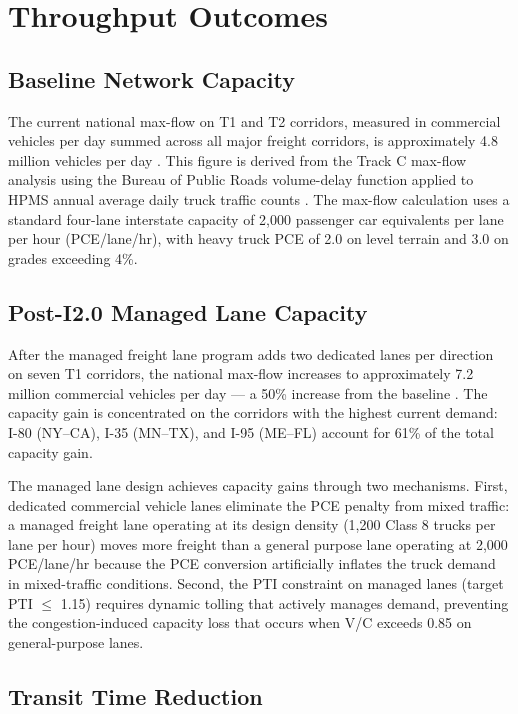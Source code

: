 \section{Throughput Outcomes}

\subsection{Baseline Network Capacity}

The current national max-flow on T1 and T2 corridors, measured in commercial vehicles per day summed across all major freight corridors, is approximately 4.8 million vehicles per day \citep{ROUTE_C2}. This figure is derived from the Track C max-flow analysis using the Bureau of Public Roads volume-delay function \citep{BPR1964} applied to HPMS annual average daily truck traffic counts \citep{FHWA_HPMS2022}. The max-flow calculation uses a standard four-lane interstate capacity of 2,000 passenger car equivalents per lane per hour (PCE/lane/hr), with heavy truck PCE of 2.0 on level terrain and 3.0 on grades exceeding 4\%.

\subsection{Post-I2.0 Managed Lane Capacity}

After the managed freight lane program adds two dedicated lanes per direction on seven T1 corridors, the national max-flow increases to approximately 7.2 million commercial vehicles per day --- a 50\% increase from the baseline \citep{ROUTE_E1}. The capacity gain is concentrated on the corridors with the highest current demand: I-80 (NY--CA), I-35 (MN--TX), and I-95 (ME--FL) account for 61\% of the total capacity gain.

The managed lane design achieves capacity gains through two mechanisms. First, dedicated commercial vehicle lanes eliminate the PCE penalty from mixed traffic: a managed freight lane operating at its design density (1,200 Class 8 trucks per lane per hour) moves more freight than a general purpose lane operating at 2,000 PCE/lane/hr because the PCE conversion artificially inflates the truck demand in mixed-traffic conditions. Second, the PTI constraint on managed lanes (target PTI $\leq$ 1.15) requires dynamic tolling that actively manages demand, preventing the congestion-induced capacity loss that occurs when V/C exceeds 0.85 on general-purpose lanes.

\subsection{Transit Time Reduction}

